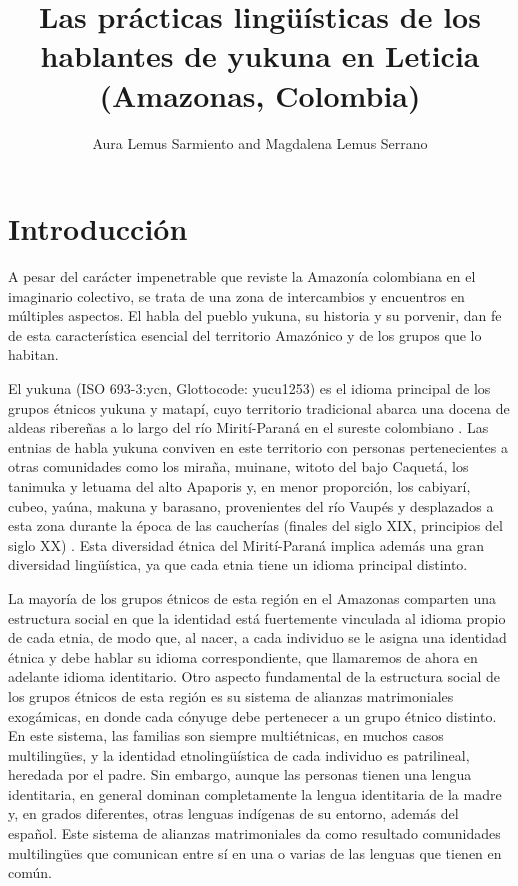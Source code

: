 \documentclass[output=paper]{langscibook}
\author{Aura Lemus Sarmiento\orcid{0000-0002-2912-7078}\affiliation{Université Paris IV} and Magdalena Lemus Serrano\orcid{0000-0001-8312-6466}\affiliation{Aix-Marseille Université}}
\title{Las prácticas lingüísticas de los hablantes de yukuna en Leticia (Amazonas, Colombia)}
\begin{document}
    \maketitle
{}%

\section{Introducción}

A pesar del carácter impenetrable que reviste la Amazonía colombiana en el imaginario colectivo, se trata de una zona de intercambios y encuentros en múltiples aspectos. El habla del pueblo yukuna, su historia y su porvenir, dan fe de esta característica esencial del territorio Amazónico y de los grupos que lo habitan. 

El yukuna (ISO 693-3:ycn, Glottocode: yucu1253) es el idioma principal de los grupos étnicos yukuna y matapí, cuyo territorio tradicional abarca una docena de aldeas ribereñas a lo largo del río Mirití-Paraná en el sureste colombiano \citep{Fontaine2001}. Las entnias de habla yukuna conviven en este territorio con personas pertenecientes a otras comunidades como los miraña, muinane, witoto del bajo Caquetá, los tanimuka y letuama del alto Apaporis y, en menor proporción, los cabiyarí, cubeo, yaúna, makuna y barasano, provenientes del río Vaupés y desplazados a esta zona durante la época de las caucherías (finales del siglo XIX, principios del siglo XX) \citep{Eraso2015}. Esta diversidad étnica del Mirití-Paraná implica además una gran diversidad lingüística, ya que cada etnia tiene un idioma principal distinto.

La mayoría de los grupos étnicos de esta región en el Amazonas comparten una estructura social en que la identidad está fuertemente vinculada al idioma propio de cada etnia, de modo que, al nacer, a cada individuo se le asigna una identidad étnica y debe hablar su idioma correspondiente, que llamaremos de ahora en adelante idioma identitario. Otro aspecto fundamental de la estructura social de los grupos étnicos de esta región es su sistema de alianzas matrimoniales exogámicas, en donde cada cónyuge debe pertenecer a un grupo étnico distinto. En este sistema, las familias son siempre multiétnicas, en muchos casos multilingües, y la identidad etnolingüística de cada individuo es patrilineal, heredada por el padre. Sin embargo, aunque las personas tienen una lengua identitaria, en general dominan completamente la lengua identitaria de la madre y, en grados diferentes, otras lenguas indígenas de su entorno, además del español. Este sistema de alianzas matrimoniales da\label{lemus:quoteforintro} como resultado comunidades multilingües que comunican entre sí en una o varias de las lenguas que tienen en común.
\end{document}
